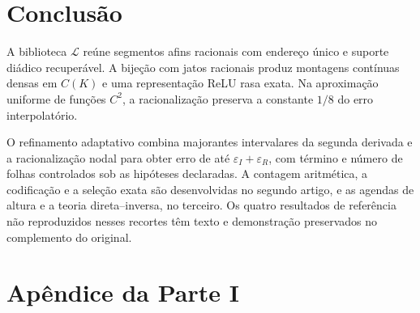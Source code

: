 \documentclass[12pt,a4paper]{article}
\theoremstyle{preciso}
\theoremstyle{definition}
\newcommand{\LL}{\mathcal L}
\theoremstyle{preciso}
\theoremstyle{preciso}
\theoremstyle{preciso}
\theoremstyle{preciso}
\theoremstyle{definition}
\theoremstyle{preciso}
\theoremstyle{definition}
\theoremstyle{preciso}
\theoremstyle{preciso}
\theoremstyle{definition}
\renewcommand{\thesection}{\Roman{part}.\arabic{section}}
\begin{document}
\begin{figure}[!htbp]
\end{figure}

\section{Conclusão}
A biblioteca $\LL$ reúne segmentos afins racionais com endereço único e suporte diádico recuperável. A bijeção com jatos racionais produz montagens contínuas densas em $C(K)$ e uma representação ReLU rasa exata. Na aproximação uniforme de funções $C^2$, a racionalização preserva a constante $1/8$ do erro interpolatório.

O refinamento adaptativo combina majorantes intervalares da segunda derivada e a racionalização nodal para obter erro de até $\varepsilon_I+\varepsilon_R$, com término e número de folhas controlados sob as hipóteses declaradas. A contagem aritmética, a codificação e a seleção exata são desenvolvidas no segundo artigo, e as agendas de altura e a teoria direta--inversa, no terceiro. Os quatro resultados de referência não reproduzidos nesses recortes têm texto e demonstração preservados no complemento do original.
\clearpage
\section*{Apêndice da Parte I}
\setcounter{section}{0}\renewcommand{\thesection}{I.\Alph{section}}
\end{document}
